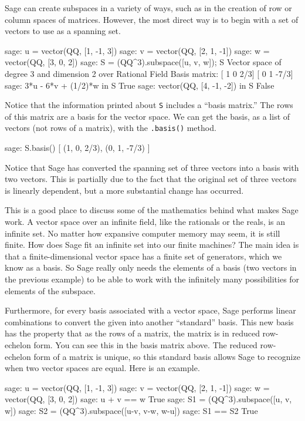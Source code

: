 %
Sage can create subspaces in a variety of ways, such as in the creation of row or column spaces of matrices.  However, the most direct way is to begin with a set of vectors to use as a spanning set.
%
\begin{sageexample}
sage: u = vector(QQ, [1, -1, 3])
sage: v = vector(QQ, [2, 1, -1])
sage: w = vector(QQ, [3, 0, 2])
sage: S = (QQ^3).subspace([u, v, w]); S
Vector space of degree 3 and dimension 2 over Rational Field
Basis matrix:
[   1    0  2/3]
[   0    1 -7/3]
sage: 3*u - 6*v + (1/2)*w in S
True
sage: vector(QQ, [4, -1, -2]) in S
False
\end{sageexample}
%
Notice that the information printed about \verb?S? includes a ``basis matrix.''  The rows of this matrix are a basis for the vector space.  We can get the basis, as a list of vectors (not rows of a matrix), with the \verb?.basis()? method.
%
\begin{sageexample}
sage: S.basis()
[
(1, 0, 2/3),
(0, 1, -7/3)
]
\end{sageexample}
%
Notice that Sage has converted the spanning set of three vectors into a basis with two vectors.  This is partially due to the fact that the original set of three vectors is linearly dependent, but a more substantial change has occurred.\par
%
This is a good place to discuss some of the mathematics behind what makes Sage work.  A vector space over an infinite field, like the rationals or the reals, is an infinite set.  No matter how expansive computer memory may seem, it is still finite.  How does Sage fit an infinite set into our finite machines?  The main idea is that a finite-dimensional vector space has a finite set of generators, which we know as a basis.  So Sage really only needs the elements of a basis (two vectors in the previous example) to be able to work with the infinitely many possibilities for elements of the subspace.\par
%
Furthermore, for every basis associated with a vector space, Sage performs linear combinations to convert the given into another ``standard'' basis.  This new basis has the property that as the rows of a matrix, the matrix is in reduced row-echelon form.  You can see this in the basis matrix above.  The reduced row-echelon form of a matrix is unique, so this standard basis allows Sage to recognize when two vector spaces are equal.  Here is an example.
%
\begin{sageexample}
sage: u = vector(QQ, [1, -1,  3])
sage: v = vector(QQ, [2,  1, -1])
sage: w = vector(QQ, [3,  0,  2])
sage: u + v == w
True
sage: S1 = (QQ^3).subspace([u, v, w])
sage: S2 = (QQ^3).subspace([u-v, v-w, w-u])
sage: S1 == S2
True
\end{sageexample}

